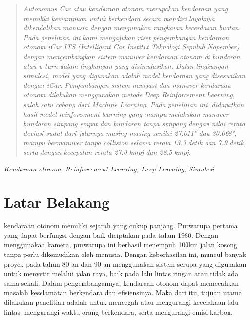 \documentclass[conference]{IEEEtran}
\begin{document}
	\maketitle
	
	
	\begin{abstract}
		\textit{\textit{Autonomus Car }atau kendaraan otonom merupakan kendaraan yang memiliki kemampuan untuk berkendara secara mandiri layaknya dikendalikan manusia dengan mengunakan rangkaian kecerdasan buatan. Pada penelitian ini kami mengajukan riset pengembangan kendaraan otonom iCar ITS (\textit{Intelligent Car }Institut Teknologi Sepuluh Nopember) dengan mengembangkan sistem manuver kendaraan otonom di bundaran atau u-turn dalam lingkungan yang disimulasikan. Dalan lingkungan simulasi, model yang digunakan adalah model kendaraan yang disesuaikan dengan iCar. Pengembangan sistem navigasi dan manuver kendaraan otonom dilakukan menggunakan metode \textit{Deep Reinforcement Learning}, salah satu cabang dari \textit{Machine Learning}. Pada penelitian ini, didapatkan hasil model reinforcement learning yang mampu melakukan manuver bundaran simpang empat dan bundaran tanpa simpang dengan nilai rerata deviasi sudut dari jalurnya masing-masing senilai 27.011° dan 30.068°, mampu bermanuver tanpa \textit{collision} selama rerata 13.3 detik dan 7.9 detik, serta dengan kecepatan rerata 27.0 kmpj dan 28.5 kmpj.}
	\end{abstract}
	\begin{IEEEkeywords}
		\textit{Kendaraan otonom, Reinforcement Learning, Deep Learning, Simulasi}
	\end{IEEEkeywords}
	
	\section{Latar Belakang}
	 kendaraan otonom memiliki sejarah yang cukup panjang. Purwarupa pertama yang dapat berfungsi dengan baik diciptakan pada tahun 1980. Dengan menggunakan kamera, purwarupa ini berhasil menempuh 100km jalan kosong tanpa perlu dikemudikan oleh manusia. Dengan keberhasilan ini, muncul banyak proyek pada tahun 80-an dan 90-an menggunakan sistem serupa yang digunakan untuk menyetir melalui jalan raya, baik pada lalu lintas ringan atau tidak ada sama sekali. Dalam pengembangannya, kendaraan otonom dapat memecahkan masalah keselamatan berkendara dan efisiensinya. Maka dari itu, tujuan utama dilakukan penelitian adalah untuk mencegah atau mengurangi kecelakaan lalu lintas, mengurangi waktu orang berkendara, serta mengurangi emisi karbon.\cite{cit:autonomous_vehicle_future}\par
	
\end{document}
